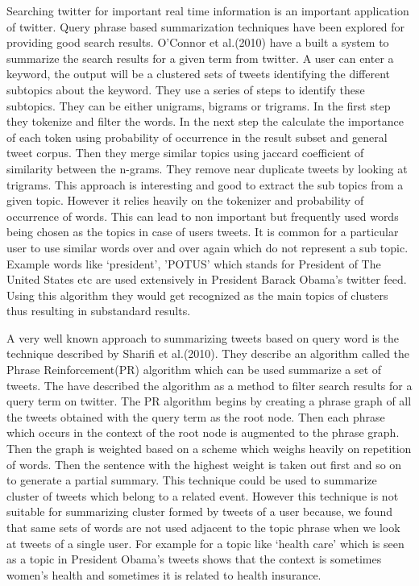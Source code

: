 Searching twitter for important real time information is an important application of twitter. Query phrase based summarization techniques have been explored for providing good search results. O’Connor et al.(2010) have a built a system to summarize the search results for a given term from twitter. A user can enter a keyword, the output will be a clustered sets of tweets identifying the different subtopics about the keyword. They use a series of steps to identify these subtopics. They can be either unigrams, bigrams or trigrams. In the first step they tokenize and filter the words. In the next step the calculate the importance of each token using probability of occurrence in the result subset and general tweet corpus. Then they merge similar topics using jaccard coefficient of similarity between the n-grams. They remove near duplicate tweets by looking at trigrams. This approach is interesting and good to extract the sub topics from a given topic. However it relies heavily on the tokenizer and probability of occurrence of words. This can lead to non important but frequently used words being chosen as the topics in case of users tweets. It is common for a particular user to use similar words over and over again which do not represent a sub topic. Example words like ‘president’, ’POTUS’ which stands for President of The United States etc are used extensively in President Barack Obama’s twitter feed. Using this algorithm they would get recognized as the main topics of clusters thus resulting in substandard results. 

A very well known approach to summarizing tweets based on query word is the technique described by Sharifi et al.(2010). They describe an algorithm called the Phrase Reinforcement(PR) algorithm which can be used summarize a set of tweets. The have described the algorithm as a method to filter search results for a query term on twitter. The PR algorithm begins by creating a phrase graph of all the tweets obtained with the query term as the root node. Then each phrase which occurs in the context of the root node is augmented to the phrase graph. Then the graph is weighted based on a scheme which weighs heavily on repetition of words. Then the sentence with the highest weight is taken out first and so on to generate a partial summary.  This technique could be used to summarize cluster of tweets which belong to a related event. However this technique is not suitable for summarizing cluster formed by tweets of a user because, we  found that same sets of words are not used adjacent to the topic phrase when we look at tweets of a single user. For example for a  topic like ‘health care’ which is seen as a topic in President Obama’s tweets shows that the context is sometimes women’s health and sometimes it is related to health insurance.

